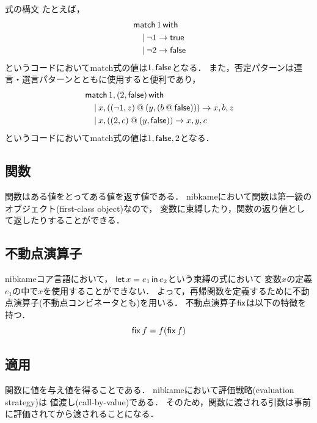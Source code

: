 \documentclass[a4paper,titlepage,report,disablejfam]{jsbook}
\begin{document}
\begin{resbonsiblesection}{式の構文}{\sakamoto}
たとえば，
\begin{equation}
\begin{aligned}
&\mathop{\mathsf{match}}1\mathop{\mathsf{with}} \\
&\quad \mathbin{|} \lnot 1\rightarrow \mathsf{true} \\
&\quad \mathbin{|} \lnot 2\rightarrow \mathsf{false} \\
\end{aligned}
\end{equation}
というコードにおいてmatch式の値は$1,\mathsf{false}$となる．
また，否定パターンは連言・選言パターンとともに使用すると便利であり，
\begin{equation}
\begin{aligned}
&\mathop{\mathsf{match}}1,(2,\mathsf{false})\mathop{\mathsf{with}} \\
&\quad \mathbin{|} x,((\lnot 1, z)\mathbin{@}(y,(b\mathbin{@}\mathsf{false})))\rightarrow x,b,z \\
&\quad \mathbin{|} x,((2, c)\mathbin{@}(y,\mathsf{false}))\rightarrow x,y,c \\
\end{aligned}
\end{equation}
というコードにおいてmatch式の値は$1,\mathsf{false},2$となる．

\subsection{関数}\label{ssc:expr-function}
関数はある値をとってある値を返す値である．
nibkameにおいて関数は第一級のオブジェクト(first-class object)なので，
変数に束縛したり，関数の返り値として返したりすることができる．

\subsection{不動点演算子}\label{ssc:expr-fix}
nibkameコア言語において，
$\mathop{\mathsf{let}} x = e_1 \mathop{\mathsf{in}} e_2$という束縛の式において
変数$x$の定義$e_1$の中で$x$を使用することができない．
よって，再帰関数を定義するために不動点演算子(不動点コンビネータとも)を用いる．
不動点演算子$\mathop{\mathsf{fix}}$は以下の特徴を持つ．
\begin{equation}
\mathop{\mathsf{fix}}f= f(\mathop{\mathsf{fix}}f)
\end{equation}

\subsection{適用}\label{ssc:expr-apply}
関数に値を与え値を得ることである．
nibkameにおいて評価戦略(evaluation strategy)は
値渡し(call-by-value)である．
そのため，関数に渡される引数は事前に評価されてから渡されることになる．

\end{resbonsiblesection}
\end{document}
